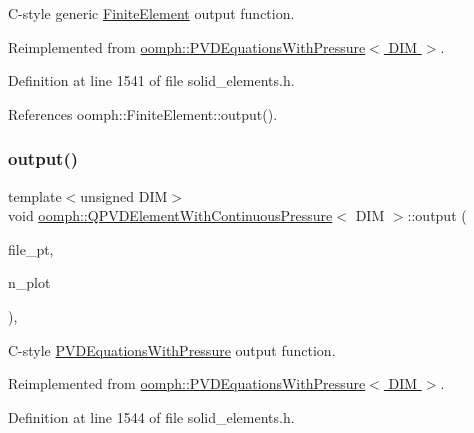 C-\/style generic \hyperlink{classoomph_1_1FiniteElement}{Finite\+Element} output function. 



Reimplemented from \hyperlink{classoomph_1_1PVDEquationsWithPressure_ae6d9a646cfd9be12134aeba45249d7c7}{oomph\+::\+P\+V\+D\+Equations\+With\+Pressure$<$ D\+I\+M $>$}.



Definition at line 1541 of file solid\+\_\+elements.\+h.



References oomph\+::\+Finite\+Element\+::output().

\mbox{\label{classoomph_1_1QPVDElementWithContinuousPressure_af9d764cc0daeb7151b37284bf2082162}} 
\subsubsection{\texorpdfstring{output()}{output()}\hspace{0.1cm}{\footnotesize\ttfamily [4/4]}}
{\footnotesize\ttfamily template$<$unsigned D\+IM$>$ \\
void \hyperlink{classoomph_1_1QPVDElementWithContinuousPressure}{oomph\+::\+Q\+P\+V\+D\+Element\+With\+Continuous\+Pressure}$<$ D\+IM $>$\+::output (\begin{DoxyParamCaption}\item[{F\+I\+LE $\ast$}]{file\+\_\+pt,  }\item[{const unsigned \&}]{n\+\_\+plot }\end{DoxyParamCaption})\hspace{0.3cm}{\ttfamily [inline]}, {\ttfamily [virtual]}}



C-\/style \hyperlink{classoomph_1_1PVDEquationsWithPressure}{P\+V\+D\+Equations\+With\+Pressure} output function. 



Reimplemented from \hyperlink{classoomph_1_1PVDEquationsWithPressure_a27aee23c253bef90a7f389acd376fd27}{oomph\+::\+P\+V\+D\+Equations\+With\+Pressure$<$ D\+I\+M $>$}.



Definition at line 1544 of file solid\+\_\+elements.\+h.



